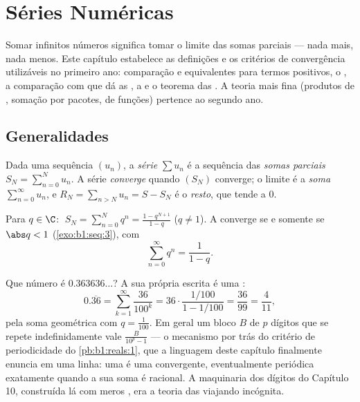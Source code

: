 \chapter{Séries Numéricas}\label{ch:b1:series}

Somar infinitos números significa tomar o limite das somas parciais ---
nada mais, nada menos. Este capítulo estabelece as definições e os
critérios de convergência utilizáveis no primeiro ano: comparação e
equivalentes para termos positivos, o , a comparação
com  que dá as , a  e o
teorema das . A teoria mais fina (produtos de ,
somação por pacotes,  de funções) pertence ao segundo ano.

\section{Generalidades}

\begin{definition}\label{def:b1:series:def}
Dada uma sequência $(u_n)$, a \emph{série} $\sum u_n$
é a sequência das \emph{somas parciais} $S_N = \sum_{n=0}^{N} u_n$.
A série \emph{converge} quando $(S_N)$ converge; o limite é a
\emph{soma} $\sum_{n=0}^{\infty} u_n$, e $R_N = \sum_{n > N} u_n =
S - S_N$ é o \emph{resto}, que tende a $0$.
\end{definition}

\begin{example}\label{ex:b1:series:geometric}
Para $q \in \C$: $\;S_N = \sum_{n=0}^{N} q^n = \frac{1 -
q^{N+1}}{1-q}$ ($q \neq 1$). A  converge se e somente se $\abs q < 1$
(\cref{exo:b1:seq:3}), com
\[
\sum_{n=0}^{\infty} q^n = \frac{1}{1 - q} .
\]
\end{example}

\begin{example}\label{ex:b1:series:periodicdecimal}
Que número é $0.363636\dots$? A sua própria escrita é uma :
\[
0.\overline{36} = \sum_{k=1}^{\infty} \frac{36}{100^k}
= 36\cdot\frac{1/100}{1 - 1/100} = \frac{36}{99} =
\frac{4}{11} ,
\]
pela soma geométrica com $q = \frac{1}{100}$. Em geral um
bloco $B$ de $p$ dígitos que se repete indefinidamente vale
$\frac{B}{10^p - 1}$ --- o mecanismo por trás do critério de periodicidade
do \cref{pb:b1:reals:1}, que a linguagem deste capítulo
finalmente enuncia em uma linha: uma  é uma 
convergente, eventualmente periódica exatamente quando a sua soma é
racional. A maquinaria dos dígitos do Capítulo 10, construída lá com
meros , era a teoria das  viajando incógnita.
\end{example}

